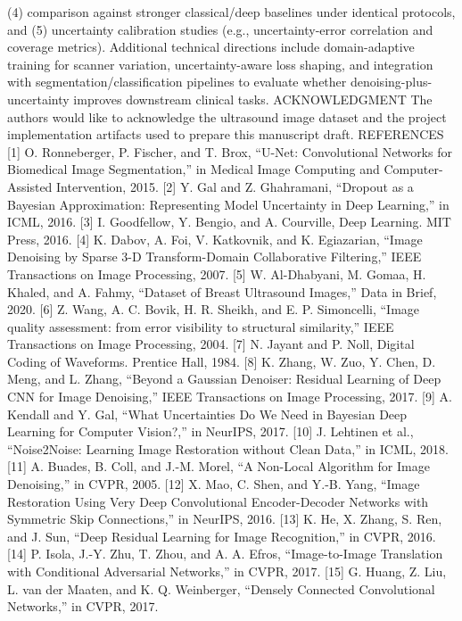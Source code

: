 (4) comparison against stronger classical/deep baselines under
identical protocols, and (5) uncertainty calibration studies
(e.g., uncertainty-error correlation and coverage metrics).
Additional technical directions include domain-adaptive
training for scanner variation, uncertainty-aware loss shaping,
and integration with segmentation/classification pipelines to
evaluate whether denoising-plus-uncertainty improves downstream clinical tasks.
ACKNOWLEDGMENT
The authors would like to acknowledge the ultrasound
image dataset and the project implementation artifacts used
to prepare this manuscript draft.
REFERENCES
[1] O. Ronneberger, P. Fischer, and T. Brox, “U-Net: Convolutional Networks for Biomedical Image Segmentation,” in Medical Image Computing and Computer-Assisted Intervention, 2015.
[2] Y. Gal and Z. Ghahramani, “Dropout as a Bayesian Approximation:
Representing Model Uncertainty in Deep Learning,” in ICML, 2016.
[3] I. Goodfellow, Y. Bengio, and A. Courville, Deep Learning. MIT Press,
2016.
[4] K. Dabov, A. Foi, V. Katkovnik, and K. Egiazarian, “Image Denoising
by Sparse 3-D Transform-Domain Collaborative Filtering,” IEEE Transactions on Image Processing, 2007.
[5] W. Al-Dhabyani, M. Gomaa, H. Khaled, and A. Fahmy, “Dataset of
Breast Ultrasound Images,” Data in Brief, 2020.
[6] Z. Wang, A. C. Bovik, H. R. Sheikh, and E. P. Simoncelli, “Image
quality assessment: from error visibility to structural similarity,” IEEE
Transactions on Image Processing, 2004.
[7] N. Jayant and P. Noll, Digital Coding of Waveforms. Prentice Hall, 1984.
[8] K. Zhang, W. Zuo, Y. Chen, D. Meng, and L. Zhang, “Beyond a Gaussian Denoiser: Residual Learning of Deep CNN for Image Denoising,”
IEEE Transactions on Image Processing, 2017.
[9] A. Kendall and Y. Gal, “What Uncertainties Do We Need in Bayesian
Deep Learning for Computer Vision?,” in NeurIPS, 2017.
[10] J. Lehtinen et al., “Noise2Noise: Learning Image Restoration without
Clean Data,” in ICML, 2018.
[11] A. Buades, B. Coll, and J.-M. Morel, “A Non-Local Algorithm for Image
Denoising,” in CVPR, 2005.
[12] X. Mao, C. Shen, and Y.-B. Yang, “Image Restoration Using Very
Deep Convolutional Encoder-Decoder Networks with Symmetric Skip
Connections,” in NeurIPS, 2016.
[13] K. He, X. Zhang, S. Ren, and J. Sun, “Deep Residual Learning for
Image Recognition,” in CVPR, 2016.
[14] P. Isola, J.-Y. Zhu, T. Zhou, and A. A. Efros, “Image-to-Image Translation with Conditional Adversarial Networks,” in CVPR, 2017.
[15] G. Huang, Z. Liu, L. van der Maaten, and K. Q. Weinberger, “Densely
Connected Convolutional Networks,” in CVPR, 2017.
